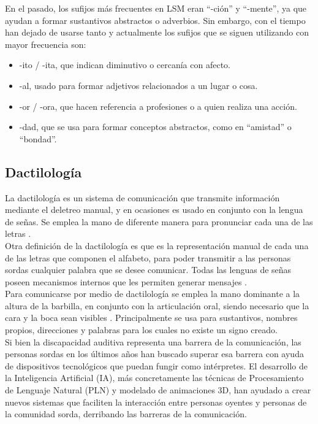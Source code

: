 En el pasado, los sufijos más frecuentes en LSM eran “-ción” y “-mente”, ya que ayudan a formar sustantivos abstractos o adverbios. Sin embargo, con el tiempo han dejado de usarse tanto y actualmente los sufijos que se siguen utilizando con mayor frecuencia son:

\begin{itemize}
    \item -ito / -ita, que indican diminutivo o cercanía con afecto.
    \item -al, usado para formar adjetivos relacionados a un lugar o cosa.
    \item -or / -ora, que hacen referencia a profesiones o a quien realiza una acción.
    \item -dad, que se usa para formar conceptos abstractos, como en “amistad” o “bondad”.
\end{itemize}

\newpage
\subsection{Dactilología}
La dactilología es un sistema de comunicación que transmite información mediante el deletreo manual, y en ocasiones es usado en conjunto con la lengua de señas. Se emplea la mano de diferente manera para pronunciar cada una de las letras \cite{ref30}.\\

Otra definición de la dactilología es que es la representación manual de cada una de las letras que componen el alfabeto, para poder transmitir a las personas sordas cualquier palabra que se desee comunicar. Todas las lenguas de señas poseen mecanismos internos que les permiten generar mensajes \cite{ref40}.\\

Para comunicarse por medio de dactilología se emplea la mano dominante a la altura de la barbilla, en conjunto con la articulación oral, siendo necesario que la cara y la boca sean visibles \cite{ref40}. Principalmente se usa para sustantivos, nombres propios, direcciones y palabras para los cuales no existe un signo creado.\\

Si bien la discapacidad auditiva representa una barrera de la comunicación, las personas sordas en los últimos años han buscado superar esa barrera con ayuda de dispositivos tecnológicos que puedan fungir como intérpretes. El desarrollo de la Inteligencia Artificial (IA), más concretamente las técnicas de Procesamiento de Lenguaje Natural (PLN) y modelado de animaciones 3D, han ayudado a crear nuevos sistemas que faciliten la interacción entre personas oyentes y personas de la comunidad sorda, derribando las barreras de la comunicación.\\

